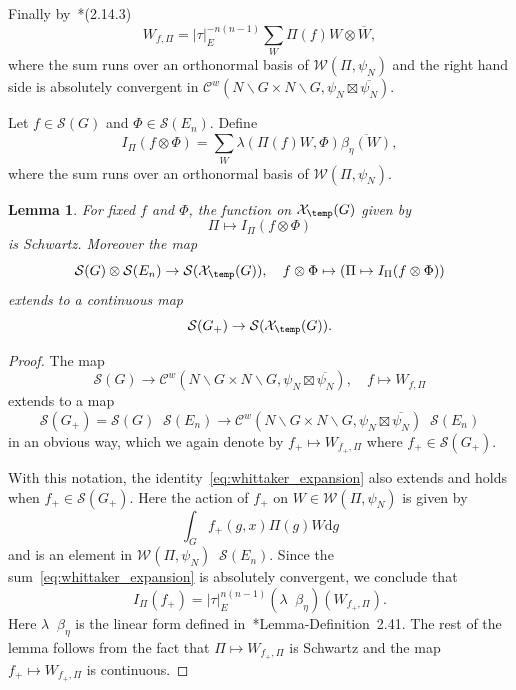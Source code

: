 \documentclass[letterpaper,11pt]{amsart}
\newcommand{\cC}{\mathcal{C}}
\newcommand{\cS}{\mathcal{S}}
\newcommand{\cW}{\mathcal{W}}
\newcommand{\cX}{\mathcal{X}}
\newcommand{\rd}{\mathrm{d}}
\newcommand{\bs}{\backslash}
\newcommand{\<}{\negthickspace}
\providecommand{\abs}[1]{\lvert#1\rvert}
\DeclareMathOperator{\otimeshat}{\widehat{\otimes}}
\theoremstyle{definition}
\theoremstyle{plain}
\newtheorem{lemma}[definition]{Lemma}
\theoremstyle{remark}
\numberwithin{equation}{section}
\begin{document}
Finally by~\cite{BP1}*{(2.14.3)}
    \begin{equation}    \label{eq:whittaker_expansion}
    W_{f, \Pi}=\abs{\tau}_E^{-n(n-1)}
     \sum_{W}
    \Pi(f)W \otimes \overline{W},
    \end{equation}
where the sum runs over an orthonormal basis of $\cW(\Pi, \psi_{N})$ and the
right hand side is absolutely convergent in $\cC^w(N \bs G \times N \bs G,
\psi_{N} \boxtimes \overline{\psi_{N}})$.



Let $f \in \cS(G)$ and $\Phi \in \cS(E_n)$. Define
\begin{equation}
\label{eq:I_pi_def}
        I_{\Pi}(f \otimes \Phi) =
    \sum_W \lambda(\Pi(f)W, \Phi) \overline{\beta_{\eta}(W)},
\end{equation}
where the sum runs over an orthonormal basis of $\cW(\Pi, \psi_{N})$.


\begin{lemma}   \label{lemma:Schwartz_I_Pi}
For fixed $f$ and $\Phi$, the function on $\cX_{\temp}(G)$ given by
    \[
    \Pi \mapsto I_{\Pi}(f \otimes \Phi)
    \]
is Schwartz. Moreover the map
    \[
    \cS(G) \otimes \cS(E_n) \to \cS(\cX_{\temp}(G)), \quad
    f \otimes \Phi \mapsto (\Pi \mapsto I_\Pi(f \otimes \Phi))
    \]
extends to a continuous map
    \[
    \cS(G_+) \to \cS(\cX_{\temp}(G)).
    \]
\end{lemma}

\begin{proof}
The map
    \[
    \cS(G) \to \cC^w(N \bs G \times N \bs G,
    \psi_{N} \boxtimes \overline{\psi_{N}}), \quad
    f \mapsto W_{f, \Pi}
    \]
extends to a map
    \[
    \cS(G_+) = \cS(G) \otimeshat \cS(E_n) \to
    \cC^w(N \bs G \times N \bs G,
    \psi_{N} \boxtimes \overline{\psi_{N}}) \otimeshat \cS(E_n)
    \]
in an obvious way, which we again denote by $f_+ \mapsto W_{f_+, \Pi}$ where
$f_+ \in \cS(G_+)$.

With this notation, the identity~\eqref{eq:whittaker_expansion} also extends
and holds when $f_+ \in \cS(G_+)$. Here the action of $f_+$ on $W \in
\cW(\Pi, \psi_{N})$ is given by
    \[
    \int_{G} f_+(g, x) \Pi(g) W \rd g
    \]
and is an element in $\cW(\Pi, \psi_{N}) \otimeshat \cS(E_n)$. Since the
sum~\eqref{eq:whittaker_expansion} is absolutely convergent, we conclude that
    \begin{equation}    \label{eq:I_linear_form}
    I_{\Pi}(f_+) = \abs{\tau}_E^{n(n-1)}
    (\lambda \otimeshat \beta_{\eta})(W_{f_+, \Pi}).
    \end{equation}
Here $\lambda \otimeshat \beta_{\eta}$ is the linear form defined
in~\cite{BP1}*{Lemma-Definition~2.41}. The rest of the lemma follows from the
fact that $\Pi \mapsto W_{f_+, \Pi}$ is Schwartz and the map $f_+ \mapsto
W_{f_+, \Pi}$ is continuous.
\end{proof}
\end{document}
